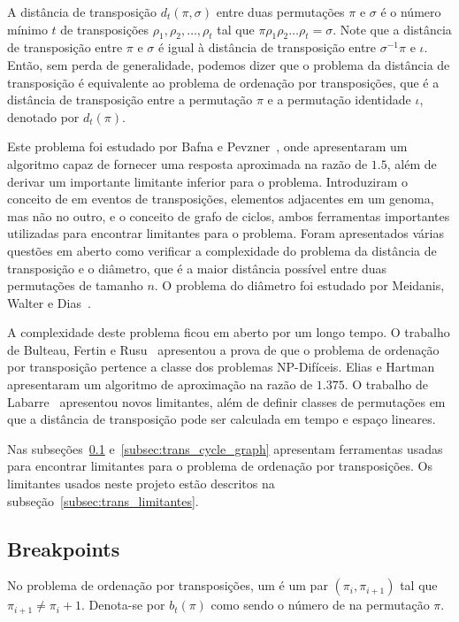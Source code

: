 A distância de transposição $d_{t}(\pi, \sigma)$ entre duas
permutações $\pi$ e $\sigma$ é o número mínimo $t$ de transposições
$\rho_{1}, \rho_{2}, \ldots, \rho_{t}$ tal que
$\pi \rho_{1} \rho_{2} \ldots \rho_{t} = \sigma$. Note que a distância
de transposição entre $\pi$ e $\sigma$ é igual à distância de transposição
entre $\sigma^{-1} \pi$ e $\iota$. Então, sem perda de generalidade,
podemos dizer que o problema da distância de transposição é
equivalente ao problema de ordenação por transposições, que é a
distância de transposição entre a permutação $\pi$ e a permutação
identidade $\iota$, denotado por $d_{t}(\pi)$.

Este problema foi estudado por Bafna e
Pevzner~\cite{BafnaPevzner*1998}, onde apresentaram um algoritmo capaz
de fornecer uma resposta aproximada na razão de $1.5$, além de derivar
um importante limitante inferior para o problema. Introduziram o
conceito de \bkp{} em eventos de transposições, elementos adjacentes
em um genoma, mas não no outro, e o conceito de grafo de ciclos, ambos
ferramentas importantes utilizadas para encontrar limitantes para o
problema. Foram apresentados várias questões em aberto como verificar
a complexidade do problema da distância de transposição e o diâmetro,
que é a maior distância possível entre duas permutações de tamanho
$n$. O problema do diâmetro foi estudado por Meidanis, Walter e
Dias~\cite{MeidanisWalterDias*1997}.

A complexidade deste problema ficou em aberto por um longo tempo. O
trabalho de Bulteau, Fertin e Rusu~\cite{BulteauFertinRusu*2010}
apresentou a prova de que o problema de ordenação por transposição
pertence a classe dos problemas NP-Difíceis. Elias e
Hartman~\cite{EliasHartman*2006} apresentaram um algoritmo de
aproximação na razão de $1.375$. O trabalho de
Labarre~\cite{Labarre*2006} apresentou novos limitantes, além de
definir classes de permutações em que a distância de transposição pode
ser calculada em tempo e espaço lineares.

Nas subseções~\ref{subsec:trans_bkp} e~\ref{subsec:trans_cycle_graph}
apresentam ferramentas usadas para encontrar limitantes para o
problema de ordenação por transposições. Os limitantes usados neste
projeto estão descritos na subseção~\ref{subsec:trans_limitantes}.

\subsection{Breakpoints}
\label{subsec:trans_bkp}
No problema de ordenação por transposições, um \bkp{} é um par
$(\pi_{i}, \pi_{i+1})$ tal que $\pi_{i+1} \neq \pi_{i} + 1$. Denota-se
por $b_{t}(\pi)$ como sendo o número de \bkp{} na permutação $\pi$.

